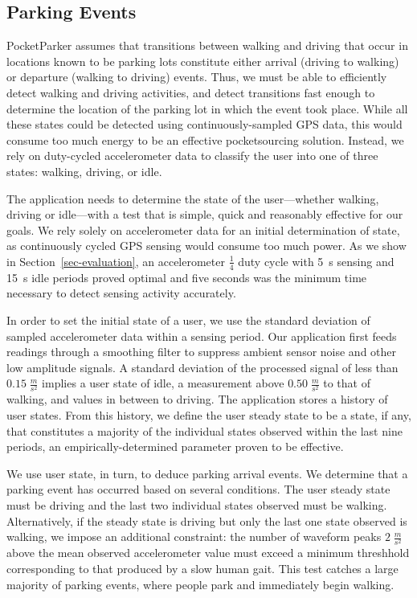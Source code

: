\subsection{Parking Events}
\label{subsec-goals}

PocketParker assumes that transitions between walking and driving that occur
in locations known to be parking lots constitute either arrival (driving to
walking) or departure (walking to driving) events. Thus, we must be able to
efficiently detect walking and driving activities, and detect transitions
fast enough to determine the location of the parking lot in which the event
took place. While all these states could be detected using
continuously-sampled GPS data, this would consume too much energy to be an
effective pocketsourcing solution. Instead, we rely on duty-cycled
accelerometer data to classify the user into one of three states: walking,
driving, or idle.

The application needs to determine the state of the user---whether walking,
driving or idle---with a test that is simple, quick and reasonably effective
for our goals.  We rely solely on accelerometer data for an initial
determination of state, as continuously cycled GPS sensing would consume too
much power. As we show in Section~\ref{sec-evaluation}, an accelerometer
$\frac{1}{4}$ duty cycle with 5~s sensing and 15~s idle periods proved
optimal and five seconds was the minimum time necessary to detect sensing
activity accurately.

In order to set the initial state of a user, we use the standard deviation of
sampled accelerometer data within a sensing period. Our application first
feeds readings through a smoothing filter to suppress ambient sensor noise
and other low amplitude signals. A standard deviation of the processed signal
of less than $0.15\;\frac{m}{s^2}$ implies a user state of idle, a
measurement above $0.50\;\frac{m}{s^2}$ to that of walking, and values in
between to driving. The application stores a history of user states. From
this history, we define the user steady state to be a state, if any, that
constitutes a majority of the individual states observed within the last nine
periods, an empirically-determined parameter proven to be effective.

We use user state, in turn, to deduce parking arrival events. We determine
that a parking event has occurred based on several conditions. The user
steady state must be driving and the last two individual states observed must
be walking. Alternatively, if the steady state is driving but only the last
one state observed is walking, we impose an additional constraint: the number
of waveform peaks $2\;\frac{m}{s^2}$ above the mean observed accelerometer
value must exceed a minimum threshhold corresponding to that produced by a
slow human gait.  This test catches a large majority of parking events, where
people park and immediately begin walking.

